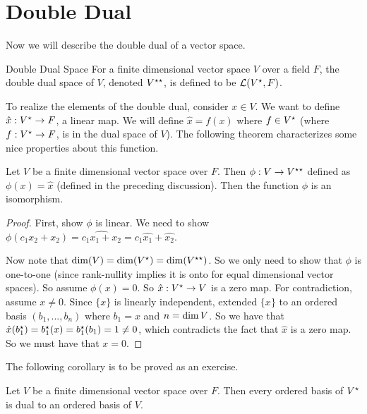 \documentclass[main.tex]{subfiles}
\begin{document}
    \section{Double Dual}
    Now we will describe the double dual of a vector space. 
    \begin{defn}{Double Dual Space}{}
        For a finite dimensional vector space $V$ over a field $F$, the double dual space of $V$, denoted $V^{\star\star}$, is defined to be $\mathcal{L}(V^{\star}, F)$.
    \end{defn}
    To realize the elements of the double dual, consider $x\in V$. We want to define $\hat{x} : V^{\star} \to F$, a linear map. We will define $\hat{x} = f(x)$ where $f\in V^{\star}$ (where $f: V^{\star} \to F$, is in the dual space of $V$). The following theorem characterizes some nice properties about this function. 
    \begin{thrm}{}{}
        Let $V$ be a finite dimensional vector space over $F$. Then $\phi: V\to V^{\star\star}$ defined as $\phi(x) = \hat{x}$ (defined in the preceding discussion). Then the function $\phi$ is an isomorphism. 
    \end{thrm}
    \begin{proof}
        First, show $\phi$ is linear. We need to show $\phi(c_1x_2 + x_2) = \widehat{c_1x_1 + x_2} = c_1\hat{x_1} + \hat{x_2}$. \par 

        Now note that $\operatorname{dim} (V) = \operatorname{dim} (V^{\star}) = \operatorname{dim} (V^{\star\star})$. So we only need to show that $\phi$ is one-to-one (since rank-nullity implies it is onto for equal dimensional vector spaces). So assume $\phi(x) = 0$. So $\hat{x}:V^{\star}\to V$ is a zero map. For contradiction, assume $x\neq 0$. Since $\{x\}$ is linearly independent, extended $\{x\}$ to an ordered basis $(b_1, ..., b_n)$ where $b_1 = x$ and $n = \operatorname{dim} V$. So we have that $\hat{x}(b_1^{\star}) = b_1^{\star} (x) = b_1^{\star} (b_1) = 1 \neq 0$, which contradicts the fact that $\hat{x}$ is a zero map. So we must have that $x = 0$. 
    \end{proof}
    The following corollary is to be proved as an exercise. 
    \begin{cor}{}{}
        Let $V$ be a finite dimensional vector space over $F$. Then every ordered basis of $V^{\star}$ is dual to an ordered basis of $V$. 
    \end{cor}
\end{document}
